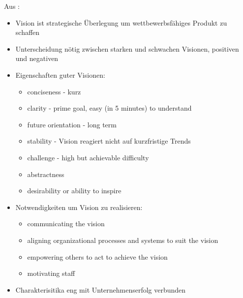 Aus :
\begin{itemize}
	\item Vision ist strategische Überlegung um wettbewerbsfähiges Produkt 
zu schaffen
	\item Unterscheidung nötig zwischen starken und schwachen Visionen, 
positiven und negativen
	\item Eigenschaften guter Visionen: \\
	\begin{itemize}
		\item conciseness - kurz
		\item clarity - prime goal, easy (in 5 minutes) to understand
		\item future orientation - long term
		\item stability - Vision reagiert nicht auf kurzfristige Trends
		\item challenge - high but achievable difficulty
		\item abstractness
		\item desirability or ability to inspire
	\end{itemize}
	\item Notwendigkeiten um Vision zu realisieren: \\
	\begin{itemize}
		\item communicating the vision
		\item aligning organizational processes and systems to suit the 
vision
		\item empowering others to act to achieve the vision
		\item motivating staff
	\end{itemize}
	\item Charakterisitika eng mit Unternehmenserfolg verbunden


\end{itemize}


